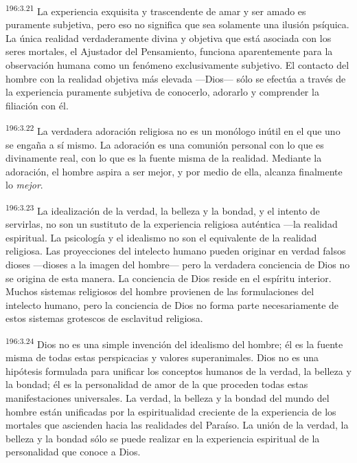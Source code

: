 \par
\textsuperscript{196:3.21} La experiencia exquisita y trascendente de amar y ser amado es puramente subjetiva, pero eso no significa que sea solamente una ilusión psíquica. La única realidad verdaderamente divina y objetiva que está asociada con los seres mortales, el Ajustador del Pensamiento, funciona aparentemente para la observación humana como un fenómeno exclusivamente subjetivo. El contacto del hombre con la realidad objetiva más elevada ---Dios--- sólo se efectúa a través de la experiencia puramente subjetiva de conocerlo, adorarlo y comprender la filiación con él.

\par
\textsuperscript{196:3.22} La verdadera adoración religiosa no es un monólogo inútil en el que uno se engaña a sí mismo. La adoración es una comunión personal con lo que es divinamente real, con lo que es la fuente misma de la realidad. Mediante la adoración, el hombre aspira a ser mejor, y por medio de ella, alcanza finalmente lo \textit{mejor}.

\par
\textsuperscript{196:3.23} La idealización de la verdad, la belleza y la bondad, y el intento de servirlas, no son un sustituto de la experiencia religiosa auténtica ---la realidad espiritual. La psicología y el idealismo no son el equivalente de la realidad religiosa. Las proyecciones del intelecto humano pueden originar en verdad falsos dioses ---dioses a la imagen del hombre--- pero la verdadera conciencia de Dios no se origina de esta manera. La conciencia de Dios reside en el espíritu interior. Muchos sistemas religiosos del hombre provienen de las formulaciones del intelecto humano, pero la conciencia de Dios no forma parte necesariamente de estos sistemas grotescos de esclavitud religiosa.

\par
\textsuperscript{196:3.24} Dios no es una simple invención del idealismo del hombre; él es la fuente misma de todas estas perspicacias y valores superanimales. Dios no es una hipótesis formulada para unificar los conceptos humanos de la verdad, la belleza y la bondad; él es la personalidad de amor de la que proceden todas estas manifestaciones universales. La verdad, la belleza y la bondad del mundo del hombre están unificadas por la espiritualidad creciente de la experiencia de los mortales que ascienden hacia las realidades del Paraíso. La unión de la verdad, la belleza y la bondad sólo se puede realizar en la experiencia espiritual de la personalidad que conoce a Dios.

